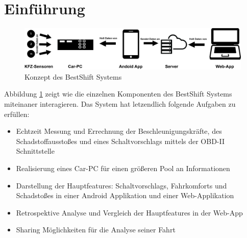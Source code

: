 \section{Einführung}
\label{sec:intro}

\begin{figure}[!htb]
	\centering
	\includegraphics[scale=0.6]{images/konzept}
	\caption{Konzept des BestShift Systems}
	\label{fig:konzept1}
\end{figure}

Abbildung \ref{fig:konzept1} zeigt wie die einzelnen Komponenten des BestShift Systems miteinaner interagieren. Das System hat letzendlich folgende Aufgaben zu erfüllen:

\begin{itemize}
	\item Echtzeit Messung und Errechnung der Beschleunigungskräfte, des Schadstoffausstoßes und eines Schaltvorschlags mittels der OBD-II Schnittstelle
	\item Realisierung eines Car-PC für einen größeren Pool an Informationen
	\item Darstellung der Hauptfeatures: Schaltvorschlags, Fahrkomforts und Schadstoßes in einer Android Applikation und einer Web-Applikation
	\item Retrospektive Analyse und Vergleich der Hauptfeatures in der Web-App
	\item Sharing Möglichkeiten für die Analyse seiner Fahrt
\end{itemize}




